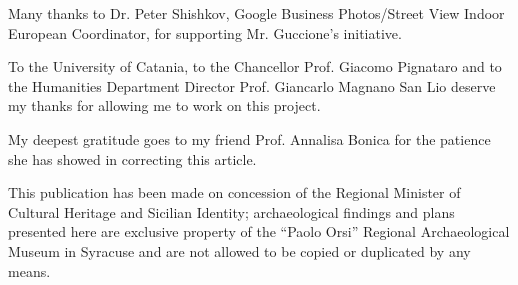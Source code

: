 \documentclass[amsthm,ebook]{saparticle}
\begin{document}
Many thanks to Dr. Peter Shishkov, Google Business Photos/Street View Indoor European Coordinator, for supporting Mr.
Guccione’s initiative.

To the University of Catania, to the Chancellor Prof. Giacomo Pignataro and to the Humanities Department Director Prof.
Giancarlo Magnano San Lio deserve my thanks for allowing me to work on this project.

My deepest gratitude goes to my friend Prof. Annalisa Bonica for the patience she has showed in correcting this
article.

This publication has been made on concession of the Regional Minister of Cultural Heritage and Sicilian Identity;
archaeological findings and plans presented here are exclusive property of the ``Paolo Orsi'' Regional Archaeological
Museum in Syracuse and are not allowed to be copied or duplicated by any means.

\nocite{Farman}


\end{document}
